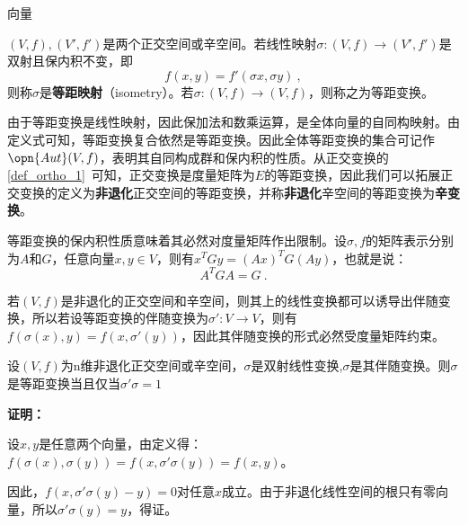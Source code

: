 
\begin{issues}
\issueDraft 向量
\end{issues}


\begin{definition}{}
$(V,f),(V',f')$是两个正交空间或辛空间。若线性映射$\sigma:(V,f)\rightarrow (V',f')$是双射且保内积不变，即\begin{equation}
f(x,y)=f'(\sigma x,\sigma y)~,
\end{equation}
则称$\sigma $是\textbf{等距映射}（isometry）。若$\sigma:(V,f)\rightarrow (V,f)$，则称之为等距变换。
\end{definition}
由于等距变换是线性映射，因此保加法和数乘运算，是全体向量的自同构映射。由定义式可知，等距变换复合依然是等距变换。因此全体等距变换的集合可记作$\opn{Aut}(V,f)$，表明其自同构成群和保内积的性质。从正交变换的\autoref{def_ortho_1}~可知，正交变换是度量矩阵为$E$的等距变换，因此我们可以拓展正交变换的定义为\textbf{非退化}正交空间的等距变换，并称\textbf{非退化}辛空间的等距变换为\textbf{辛变换}。

等距变换的保内积性质意味着其必然对度量矩阵作出限制。设$\sigma,f$的矩阵表示分别为$A$和$G$，任意向量$x,y\in V$，则有$x^{T}Gy=(Ax)^TG(Ay)$，也就是说：
\begin{equation}
A^TGA=G~.
\end{equation}

若$(V,f)$是非退化的正交空间和辛空间，则其上的线性变换都可以诱导出伴随变换，所以若设等距变换的伴随变换为$\sigma':V\rightarrow V$，则有$f(\sigma(x),y)=f(x,\sigma'(y))$，因此其伴随变换的形式必然受度量矩阵约束。
\begin{theorem}{}
设$(V,f)$为n维非退化正交空间或辛空间，$\sigma$是双射线性变换,$\sigma$是其伴随变换。则$\sigma$是等距变换当且仅当$\sigma'\sigma=1$
\end{theorem}
\textbf{证明：}

设$x,y$是任意两个向量，由定义得：$f(\sigma(x),\sigma(y))=f(x,\sigma'\sigma(y))=f(x,y)$。

因此，$f(x,\sigma'\sigma(y)-y)=0$对任意$x$成立。由于非退化线性空间的根只有零向量，所以$\sigma'\sigma(y)=y$，得证。